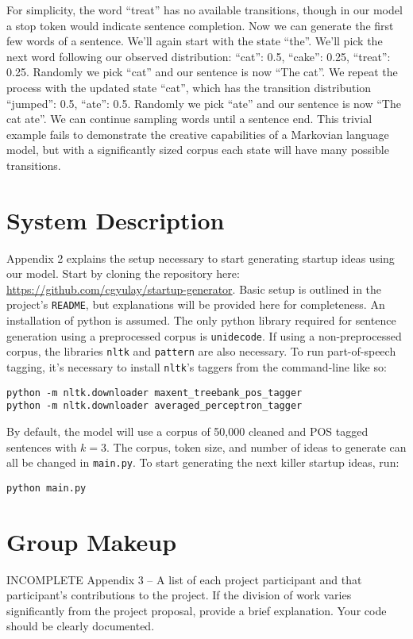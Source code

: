 \documentclass[11pt]{article}
\begin{document}
For simplicity, the word ``treat'' has no available transitions, though in our model a stop token would indicate sentence completion. Now we can generate the first few words of a sentence. We'll again start with the state ``the''. We'll pick the next word following our observed distribution: ``cat'': 0.5, ``cake'': 0.25, ``treat'': 0.25. Randomly we pick ``cat'' and our sentence is now ``The cat''. We repeat the process with the updated state ``cat'', which has the transition distribution ``jumped'': 0.5, ``ate'': 0.5. Randomly we pick ``ate'' and our sentence is now ``The cat ate''. We can continue sampling words until a sentence end. This trivial example fails to demonstrate the creative capabilities of a Markovian language model, but with a significantly sized corpus each state will have many possible transitions.

\section{System Description}

Appendix 2 explains the setup necessary to start generating startup ideas using our model. Start by cloning the repository here: \url{https://github.com/cgyulay/startup-generator}. Basic setup is outlined in the project's \texttt{README}, but explanations will be provided here for completeness. An installation of python is assumed. The only python library required for sentence generation using a preprocessed corpus is \texttt{unidecode}. If using a non-preprocessed corpus, the libraries \texttt{nltk} and \texttt{pattern} are also necessary. To run part-of-speech tagging, it's necessary to install \texttt{nltk}'s taggers from the command-line like so:
\begin{lstlisting}
python -m nltk.downloader maxent_treebank_pos_tagger
python -m nltk.downloader averaged_perceptron_tagger
\end{lstlisting}
By default, the model will use a corpus of 50,000 cleaned and POS tagged sentences with \(k=3\). The corpus, token size, and number of ideas to generate can all be changed in \texttt{main.py}. To start generating the next killer startup ideas, run:
\begin{lstlisting}
python main.py
\end{lstlisting}

\section{Group Makeup}
INCOMPLETE
 Appendix 3 – A list of each project participant and that
participant’s contributions to the project. If the division of work
varies significantly from the project proposal, provide a brief
explanation.  Your code should be clearly documented. 



 

\end{document}
